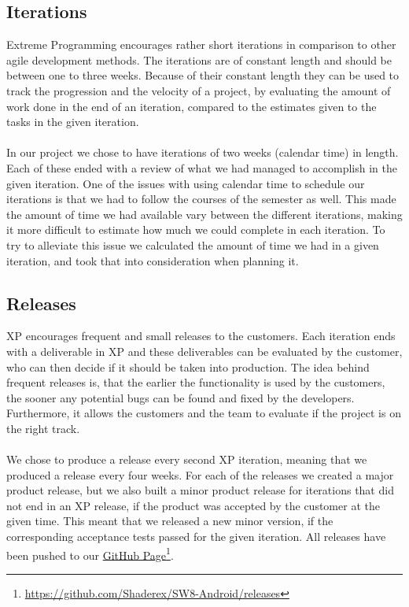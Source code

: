 \subsection{Iterations}
\label{sub:iterations}
Extreme Programming encourages rather short iterations in comparison to other agile development methods. The iterations are of constant length and should be between one to three weeks. Because of their constant length they can be used to track the progression and the velocity of a project, by evaluating the amount of work done in the end of an iteration, compared to the estimates given to the tasks in the given iteration. 
\\\\
In our project we chose to have iterations of two weeks (calendar time) in length. Each of these ended with a review of what we had managed to accomplish in the given iteration. One of the issues with using calendar time to schedule our iterations is that we had to follow the courses of the semester as well. This made the amount of time we had available vary between the different iterations, making it more difficult to estimate how much we could complete in each iteration. To try to alleviate this issue we calculated the amount of time we had in a given iteration, and took that into consideration when planning it. 

\subsection{Releases}
XP encourages frequent and small releases to the customers. Each iteration ends with a deliverable in XP and these deliverables can be evaluated by the customer, who can then decide if it should be taken into production. The idea behind frequent releases is, that the earlier the functionality is used by the customers, the sooner any potential bugs can be found and fixed by the developers. Furthermore, it allows the customers and the team to evaluate if the project is on the right track.
\\\\
We chose to produce a release every second XP iteration, meaning that we produced a release every four weeks. For each of the releases we created a major product release, but we also built a minor product release for iterations that did not end in an XP release, if the product was accepted by the customer at the given time. This meant that we released a new minor version, if the corresponding acceptance tests passed for the given iteration. All releases have been pushed to our \href{https://github.com/Shaderex/SW8-Android/releases}{GitHub Page}\footnote{\url{https://github.com/Shaderex/SW8-Android/releases}}.

